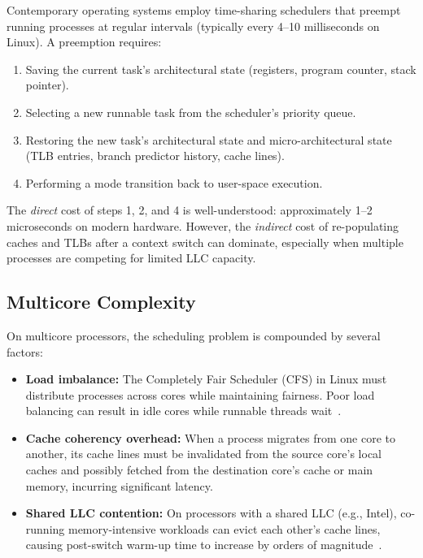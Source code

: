\documentclass[conference]{IEEEtran}
\begin{document}
Contemporary operating systems employ time-sharing schedulers that preempt
running processes at regular intervals (typically every 4--10 milliseconds on
Linux). A preemption requires:

\begin{enumerate}
  \item Saving the current task's architectural state (registers, program
        counter, stack pointer).
  \item Selecting a new runnable task from the scheduler's priority queue.
  \item Restoring the new task's architectural state and micro-architectural
        state (TLB entries, branch predictor history, cache lines).
  \item Performing a mode transition back to user-space execution.
\end{enumerate}

The \textit{direct} cost of steps 1, 2, and 4 is well-understood: approximately
1--2 microseconds on modern hardware. However, the \textit{indirect} cost of
re-populating caches and TLBs after a context switch can dominate, especially
when multiple processes are competing for limited LLC capacity.

\subsection{Multicore Complexity}

On multicore processors, the scheduling problem is compounded by several
factors:

\begin{itemize}
  \item \textbf{Load imbalance:} The Completely Fair Scheduler (CFS) in Linux
        must distribute processes across cores while maintaining fairness.
        Poor load balancing can result in idle cores while runnable threads
        wait~\cite{lozi2016linux}.
  \item \textbf{Cache coherency overhead:} When a process migrates from one
        core to another, its cache lines must be invalidated from the source
        core's local caches and possibly fetched from the destination core's
        cache or main memory, incurring significant latency.
  \item \textbf{Shared LLC contention:} On processors with a shared LLC (e.g.,
        Intel), co-running memory-intensive workloads can evict each other's
        cache lines, causing post-switch warm-up time to increase by orders of
        magnitude~\cite{blagodurov2011numa}.
\end{itemize}
\end{document}
